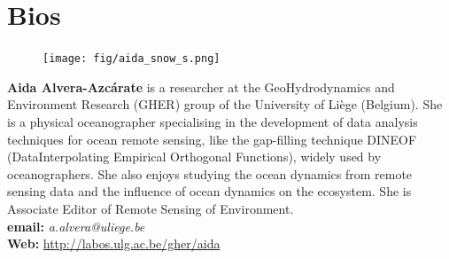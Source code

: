 \section{Bios}
\label{sec:bios}


\parbox{6.5in}{
\begin{figure} %
    \vspace{-\intextsep}
    \hspace*{-.35\columnsep}\texttt{[image: fig/aida\_snow\_s.png]}
\end{figure}
\textbf{Aida Alvera-Azcárate} is a researcher at the GeoHydrodynamics
and Environment Research (GHER) group of the University of Li\`{e}ge
(Belgium). She is a physical oceanographer specialising in the
development of data analysis techniques for ocean remote sensing, like
the gap-filling technique DINEOF (DataInterpolating Empirical Orthogonal
Functions), widely used by oceanographers. She also enjoys studying the
ocean dynamics from remote sensing data and the influence of ocean
dynamics on the ecosystem. She is Associate Editor of Remote Sensing of
Environment.\\

\textbf{email: }\emph{a.alvera@uliege.be}\\
\textbf{Web: }\url{http://labos.ulg.ac.be/gher/aida}
}

\vspace{20mm}

